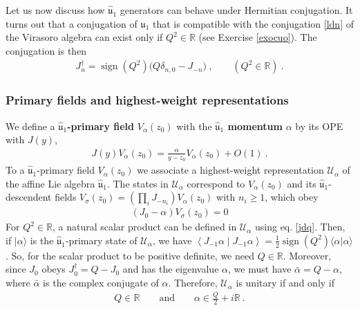 \documentclass[12pt, a4paper, notitlepage, twoside]{report}
\numberwithin{equation}{section}
\theoremstyle{break}
\begin{document}
Let us now discuss how $\hat{\mathfrak{u}}_1$ generators can behave under Hermitian conjugation.
It turns out that a conjugation of $\hat{\mathfrak{u}}_1$ that is compatible with the conjugation \eqref{ldn} of the Virasoro algebra  can exist only if $Q^2\in\mathbb{R}$ (see Exercise \ref{exocuo}). 
The conjugation is then 
\begin{align}
 J_n^\dagger = \operatorname{sign}(Q^2)\big( Q\delta_{n,0}-J_{-n} \big)\ ,\qquad (Q^2\in\mathbb{R}) \ .
\label{jdq}
\end{align}

\subsubsection{Primary fields and highest-weight representations}

We define a \textbf{\boldmath $\hat{\mathfrak{u}}_1$-primary field} $V_{\alpha}(z_0)$ with the \textbf{\boldmath $\hat{\mathfrak{u}}_1$ momentum} $\alpha$ by its OPE with $J(y)$,
\begin{align}
 \boxed{J(y) V_\alpha(z_0) = \frac{\alpha}{y-z_0} V_\alpha(z_0) + O(1)}\ .
\label{jva}
\end{align}
To a $\hat{\mathfrak{u}}_1$-primary field $V_\alpha(z_0)$ we associate a highest-weight representation $\mathcal{U}_\alpha$ of the  affine Lie algebra $\hat{\mathfrak{u}}_1$.
The states in $\mathcal{U}_\alpha$ correspond to $V_\alpha(z_0)$ and its $\hat{\mathfrak{u}}_1$-descendent fields $V_\sigma(z_0)=\left(\prod_i J_{-n_i}\right) V_\alpha(z_0)$ with $n_i\geq 1$, which obey 
\begin{align}
 \left(J_0 - \alpha\right) V_\sigma(z_0) = 0
\label{jma}
\end{align}
For $Q^2\in\mathbb{R}$, 
a natural scalar product can be defined in $\mathcal{U}_\alpha$ using eq. \eqref{jdq}.
Then, if $|\alpha\rangle$ is the $\hat{\mathfrak{u}}_1$-primary state of $\mathcal{U}_\alpha$, we have $\left< J_{-1}\alpha\middle|J_{-1}\alpha\right> = \frac12 \operatorname{sign}(Q^2) \langle \alpha|\alpha\rangle$.
So, for the scalar product to be positive definite, we need $Q\in \mathbb{R}$.
Moreover, since $J_0$ obeys $J_0^\dagger = Q-J_0$ and has the eigenvalue $\alpha$, we must have $\bar\alpha = Q-\alpha$, where $\bar \alpha$ is the complex conjugate of $\alpha$.
Therefore, $\mathcal{U}_\alpha$ is unitary if and only if
\begin{align}
 Q\in\mathbb{R} \qquad \text{and} \qquad \alpha \in \frac{Q}{2} + i{\mathbb{R}}\ .
\label{aif}
\end{align}
\end{document}
